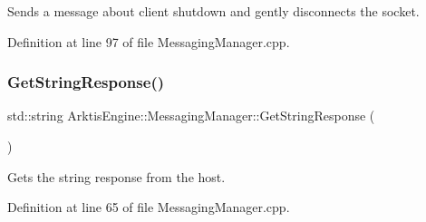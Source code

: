 Sends a message about client shutdown and gently disconnects the socket. 

\begin{DoxyVerb}\end{DoxyVerb}
 

Definition at line 97 of file Messaging\+Manager.\+cpp.


\begin{DoxyCode}{0}

\end{DoxyCode}
\mbox{\label{class_arktis_engine_1_1_messaging_manager_a8c8d641ed44a7ffff9ac0cb128991edf}} 
\subsubsection{\texorpdfstring{GetStringResponse()}{GetStringResponse()}\hspace{0.1cm}{\footnotesize\ttfamily [1/2]}}
{\footnotesize\ttfamily std\+::string Arktis\+Engine\+::\+Messaging\+Manager\+::\+Get\+String\+Response (\begin{DoxyParamCaption}{ }\end{DoxyParamCaption})}



Gets the string response from the host. 

\begin{DoxyVerb}\end{DoxyVerb}
 

Definition at line 65 of file Messaging\+Manager.\+cpp.


